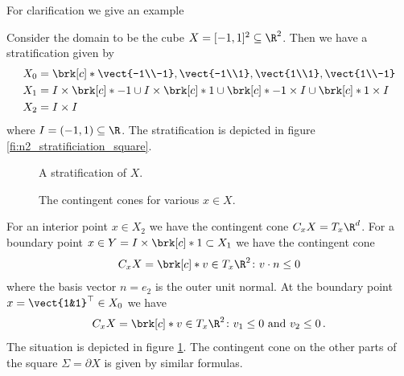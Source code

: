 For clarification we give an example
\begin{example}
  Consider the domain to be the cube $X=[-1,1]^2\subseteq\R^2$.
  Then we have a stratification given by
  \begin{align*}
    X_0&=\brk[c]*{\vect{-1\\-1},\vect{-1\\1},\vect{1\\1},\vect{1\\-1}}\\
    X_1&=I\times\brk[c]*{-1}\cup I\times\brk[c]*{1}\cup \brk[c]*{-1}\times I\cup \brk[c]*{1}\times I\\
    X_2&=I\times I
  \end{align*}
  where $I=(-1,1)\subseteq\R$.
  The stratification is depicted in figure \ref{fi:n2_stratificiation_square}.
  \begin{figure}
    \centering
    \begin{minipage}[h]{0.35\textwidth}
      
      \caption{A stratification of $X$.}
      \label{fi:n2_stratificiation_square}
    \end{minipage}
    \hfill
    \begin{minipage}[h]{0.6\textwidth}
      
      \caption{The contingent cones for various $x\in X$.}
      \label{fi:n2_tangencyCone_square}
    \end{minipage}
  \end{figure}
  For an interior point $x\in X_2$ we have 
  the contingent cone $C_xX=T_x\R^d$.
  For a boundary point $x\in Y=I\times \brk[c]*{1}\subset X_1$ we have the contingent cone
  \begin{align*}
    C_xX=\brk[c]*{v\in T_x\R^2\colon v\cdot n\leq 0}
  \end{align*}
  where the basis vector $n=e_2$ is the outer unit normal. At the boundary point $x=\vect{1&1}^\top\in X_0$ we have
  \begin{align*}
    C_xX=\brk[c]*{v\in T_x\R^2\colon v_1\leq0\text{ and }v_2\leq 0}\,.
  \end{align*}
  The situation is depicted in figure \ref{fi:n2_tangencyCone_square}.
  The contingent cone on the other parts of the square $\Sigma=\partial X$ is given by similar formulas.
\end{example}

